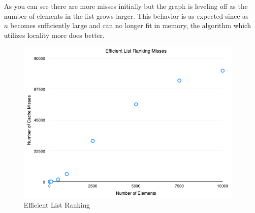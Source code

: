 \documentclass[11pt]{article}
\begin{document}
As you can see there are more misses initially but the graph is leveling off as the number of elements in the list grows larger.  This behavior is 
as expected since as $n$ becomes sufficiently large and can no longer fit in memory, the algorithm which utilizes locality more does better.

\begin{figure}[H]  
\includegraphics[scale=0.5]{figures/EfficientListRanking.png}
\caption{Efficient List Ranking}
\label{efficientlistranking}
\end{figure}
\end{document}
